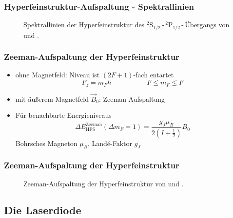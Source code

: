 


\begin{frame}
\frametitle{Hyperfeinstruktur-Aufspaltung - Spektrallinien}

\begin{figure}
    \centering
    \def\svgwidth{\textwidth}
    
    \caption{Spektrallinien der Hyperfeinstruktur des ${}^2\text{S}_{1/2}$\,-\,${}^2\text{P}_{1/2}$\,-\,Übergangs
    von  und .}
\end{figure}

\end{frame}

\begin{frame}
\frametitle{Zeeman-Aufspaltung der Hyperfeinstruktur}
\begin{itemize}
    \item<1-> ohne Magnetfeld: Niveau ist $(2F+1)$-fach entartet
    \begin{equation*}
        F_z = m_F \hbar \qquad \qquad -F \leq m_F \leq F
    \end{equation*}
    \item<2-> mit äußerem Magnetfeld $\vec{B}_0$: Zeeman-Aufspaltung
    \item<3-> Für benachbarte Energieniveaus
    \begin{equation*}
        \Delta E_\text{HFS}^\text{Zeeman}(\Delta m_F = 1) = \frac{g_J \mu_B}{2 \left( I + \frac{1}{2} \right) } B_0
    \end{equation*}
    Bohrsches Magneton $\mu_B$, Landé-Faktor $g_J$
\end{itemize}
\end{frame}

\begin{frame}
\frametitle{Zeeman-Aufspaltung der Hyperfeinstruktur}


\begin{figure}
    \centering
    \def\svgwidth{\textwidth}
    
    \caption{Zeeman-Aufspaltung der Hyperfeinstruktur von  und .}
\end{figure}

\end{frame}





\subsection{Die Laserdiode}


